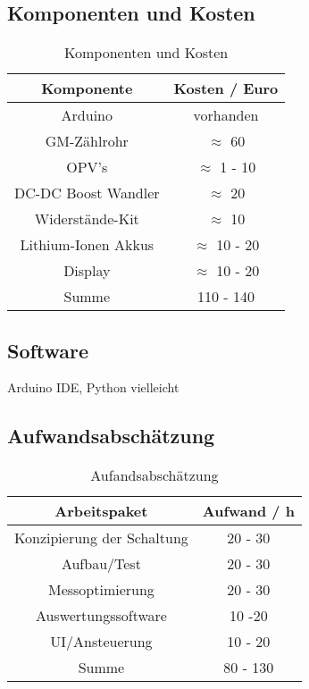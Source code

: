 \subsection*{Komponenten und Kosten}
\begin{table}[H]
    \label{tab:eins}
    \centering
    \caption{Komponenten und Kosten}
    \begin{tabular}{cc} \hline
     Komponente& Kosten / Euro\\ \hline
     Arduino& vorhanden\\ \hline
     GM-Zählrohr& $\approx$ 60  \\ \hline
     OPV's& $\approx$ 1 - 10 \\ \hline
     DC-DC Boost Wandler& $\approx$ 20  \\ \hline
     Widerstände-Kit&$\approx$ 10 \\ \hline
     Lithium-Ionen Akkus & $\approx$ 10 - 20 \\ \hline
     Display & $\approx$ 10 - 20 \\ \hline \hline
     Summe & 110 - 140 \\ \hline
    \end{tabular}
    \end{table}
\subsection*{Software}
Arduino IDE, Python vielleicht

\subsection*{Aufwandsabschätzung}
\begin{table}[H]
    \label{tab:zwei}
    \centering
    \caption{Aufandsabschätzung}
    \begin{tabular}{cc} \hline
    Arbeitspaket & Aufwand / h \\ \hline
    Konzipierung der Schaltung &  20 - 30 \\ \hline
    Aufbau/Test & 20 - 30\\ \hline
    Messoptimierung & 20 - 30  \\ \hline
    Auswertungssoftware & 10 -20 \\ \hline
    UI/Ansteuerung  & 10 - 20  \\ \hline \hline
    Summe & 80 - 130  \\ \hline
    \end{tabular}
    \end{table}
